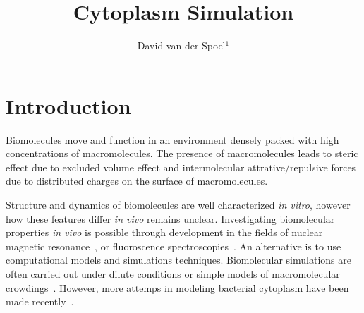 \documentclass[journal=jacsat,manuscript=article]{achemso}
\title{Cytoplasm Simulation}
\author{David van der Spoel$^1$}
\begin{document}
\maketitle


\begin{abstract}

 
\end{abstract}
\section*{Introduction}

Biomolecules move and function in an environment densely packed with high concentrations of macromolecules. The presence of macromolecules leads to steric effect due to excluded volume effect and intermolecular attrative/repulsive forces due to distributed charges on the surface of macromolecules.

Structure and dynamics of biomolecules are well characterized {\em in vitro}, however how these features differ {\em in vivo} remains unclear. 
Investigating biomolecular properties {\em in vivo} is possible through development in the fields of nuclear magnetic resonance~\cite{reckel2007,pielak2008}, or fluoroscence spectroscopies~\cite{ignatova2004,xie2008,English2011}.
An alternative is to use computational models and simulations techniques. Biomolecular simulations are often carried out under dilute conditions or simple models of macromolecular crowdings~\cite{Spiga2014a,Harada2012a,Nawrocki2017a}. However, more attemps in modeling bacterial cytoplasm have been made recently~\cite{Mcguffee2010,Yu2016a}. 
\end{document}
